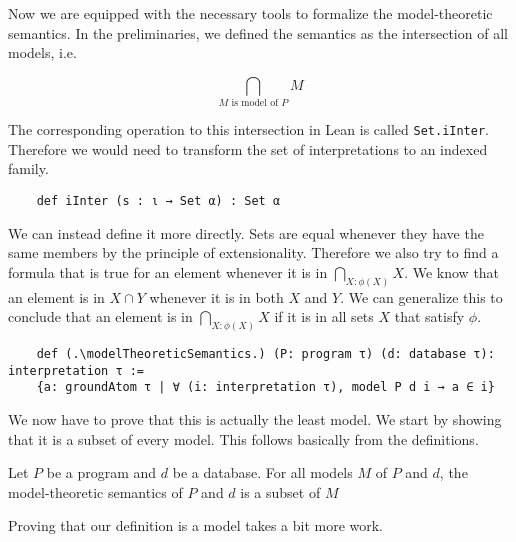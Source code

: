 Now we are equipped with the necessary tools to formalize the model-theoretic semantics. In the preliminaries, we defined the semantics as the intersection of all models, i.e.

\[\bigcap_{\text{$M$ is model of $P$}} M\] 

The corresponding operation to this intersection in Lean is called \lstinline|Set.iInter|. Therefore we would need to transform the set of interpretations to an indexed family.

\begin{lstlisting}
    def iInter (s : ι → Set α) : Set α
\end{lstlisting}

We can instead define it more directly. Sets are equal whenever they have the same members by the principle of extensionality. Therefore we also try to find a formula that is true for an element whenever it is in $\bigcap_{X: \phi(X) } X $. We know that an element is in $X \cap Y$ whenever it is in both $X$ and $Y$. We can generalize this to conclude that an element is in $\bigcap_{X: \phi(X) } X $ if it is in all sets $X$ that satisfy $\phi$.

\begin{lstlisting}
    def (.\modelTheoreticSemantics.) (P: program τ) (d: database τ): interpretation τ := 
    {a: groundAtom τ | ∀ (i: interpretation τ), model P d i → a ∈ i}
\end{lstlisting}

We now have to prove that this is actually the least model. We start by showing that it is a subset of every model. This follows basically from the definitions.

\begin{lemma}[\leastModel]\label{lem:leastModel}
    Let $P$ be a program and $d$ be a database. For all models $M$ of $P$ and $d$, the model-theoretic semantics of $P$ and $d$ is a subset of $M$
\end{lemma}

Proving that our definition is a model takes a bit more work.

